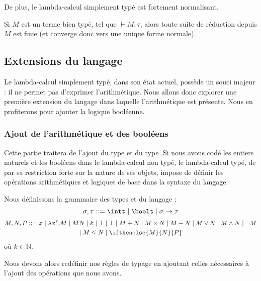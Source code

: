 De plus, le lambda-calcul simplement typé est fortement normalisant.

\begin{defi}
    Si $M$ est un terme bien typé, tel que $\vdash M :\tau$, alors toute suite de réduction depuis $M$ est finie (et converge donc vers une unique forme normale).
\end{defi}

\subsection{Extensions du langage}

Le lambda-calcul simplement typé, dans son état actuel, possède un souci majeur : il ne permet pas d'exprimer l'arithmétique. Nous allons donc explorer une première extension du langage dans laquelle l'arithmétique est présente. Nous en profiterons pour ajouter la logique booléenne.

\subsubsection{Ajout de l'arithmétique et des booléens}

Cette partie traitera de l'ajout du type \intt et du type \boolt.Si nous avons codé les entiers naturels et les booléens dans le lambda-calcul non typé, le lambda-calcul typé, de par sa restriction forte sur la nature de ses objets, impose de définir les opérations arithmétiques et logiques de base dans la syntaxe du langage.

\begin{defi}
    Nous définissons la grammaire des types et du langage :
    $$\sigma,\tau ::= \intt\mid\boolt\mid \sigma\to\tau$$
        \begin{multline*}
        M,N,P ::= x\mid \lambda x^\tau.M\mid M N\mid k\mid \top\mid\bot\mid M+N\mid M\times N\mid M-N\mid M\lor N\mid M \land N\mid \lnot M\\\mid M\leq N\mid\ifthenelse{M}{N}{P}
        \end{multline*}
    où $k\in\mathbb N$.
\end{defi}

Nous devons alors redéfinir nos règles de typage en ajoutant celles nécessaires à l'ajout des opérations que nous avons.


